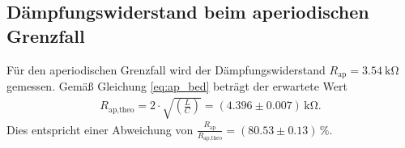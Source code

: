 \subsection{Dämpfungswiderstand beim aperiodischen Grenzfall}
Für den aperiodischen Grenzfall wird der Dämpfungswiderstand $R_\text{ap} = \qty{3.54}{\kilo\ohm}$ gemessen.
Gemäß Gleichung \eqref{eq:ap_bed} beträgt der erwartete Wert 
\begin{align}
    R_\text{ap,theo} = 2 \cdot \sqrt{\left(\frac{L}{C}\right)} =  (\num{4.396} \pm \num{0.007}) \, \unit{\kilo\ohm}.
\end{align}
Dies entspricht einer Abweichung von $ \frac{R_\text{ap}}{R_\text{ap,theo}} = (\num{80.53} \pm \num{0.13}) \, \%$.
